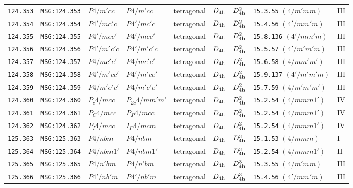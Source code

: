 \documentclass[fleqn,10pt]{jsarticle}
\begin{document}
\begin{center}
\begin{longtable}{lllllllll}
\texttt{124.353} & \texttt{MSG:124.353} & $P4/m'cc$ & $P4/m'cc$ & tetragonal & $D_{\rm 4h}$ & $D_{\rm 4h}^{2}$ & \texttt{15.3.55} $(4/m'mm)$ & III \\
\texttt{124.354} & \texttt{MSG:124.354} & $P4'/mc'c$ & $P4'/mc'c$ & tetragonal & $D_{\rm 4h}$ & $D_{\rm 4h}^{2}$ & \texttt{15.4.56} $(4'/mm'm)$ & III \\
\texttt{124.355} & \texttt{MSG:124.355} & $P4'/mcc'$ & $P4'/mcc'$ & tetragonal & $D_{\rm 4h}$ & $D_{\rm 4h}^{2}$ & \texttt{15.8.136} $(4'/mm'm)$ & III \\
\texttt{124.356} & \texttt{MSG:124.356} & $P4'/m'c'c$ & $P4'/m'c'c$ & tetragonal & $D_{\rm 4h}$ & $D_{\rm 4h}^{2}$ & \texttt{15.5.57} $(4'/m'm'm)$ & III \\
\texttt{124.357} & \texttt{MSG:124.357} & $P4/mc'c'$ & $P4/mc'c'$ & tetragonal & $D_{\rm 4h}$ & $D_{\rm 4h}^{2}$ & \texttt{15.6.58} $(4/mm'm')$ & III \\
\texttt{124.358} & \texttt{MSG:124.358} & $P4'/m'cc'$ & $P4'/m'cc'$ & tetragonal & $D_{\rm 4h}$ & $D_{\rm 4h}^{2}$ & \texttt{15.9.137} $(4'/m'm'm)$ & III \\
\texttt{124.359} & \texttt{MSG:124.359} & $P4/m'c'c'$ & $P4/m'c'c'$ & tetragonal & $D_{\rm 4h}$ & $D_{\rm 4h}^{2}$ & \texttt{15.7.59} $(4/m'm'm')$ & III \\
\texttt{124.360} & \texttt{MSG:124.360} & $P_{c}4/mcc$ & $P_{2c}4/mm'm'$ & tetragonal & $D_{\rm 4h}$ & $D_{\rm 4h}^{2}$ & \texttt{15.2.54} $(4/mmm1')$ & IV \\
\texttt{124.361} & \texttt{MSG:124.361} & $P_{C}4/mcc$ & $P_{P}4/mcc$ & tetragonal & $D_{\rm 4h}$ & $D_{\rm 4h}^{2}$ & \texttt{15.2.54} $(4/mmm1')$ & IV \\
\texttt{124.362} & \texttt{MSG:124.362} & $P_{I}4/mcc$ & $I_{P}4/mcm$ & tetragonal & $D_{\rm 4h}$ & $D_{\rm 4h}^{2}$ & \texttt{15.2.54} $(4/mmm1')$ & IV \\ \hline
\texttt{125.363} & \texttt{MSG:125.363} & $P4/nbm$ & $P4/nbm$ & tetragonal & $D_{\rm 4h}$ & $D_{\rm 4h}^{3}$ & \texttt{15.1.53} $(4/mmm)$ & I \\
\texttt{125.364} & \texttt{MSG:125.364} & $P4/nbm1'$ & $P4/nbm1'$ & tetragonal & $D_{\rm 4h}$ & $D_{\rm 4h}^{3}$ & \texttt{15.2.54} $(4/mmm1')$ & II \\
\texttt{125.365} & \texttt{MSG:125.365} & $P4/n'bm$ & $P4/n'bm$ & tetragonal & $D_{\rm 4h}$ & $D_{\rm 4h}^{3}$ & \texttt{15.3.55} $(4/m'mm)$ & III \\
\texttt{125.366} & \texttt{MSG:125.366} & $P4'/nb'm$ & $P4'/nb'm$ & tetragonal & $D_{\rm 4h}$ & $D_{\rm 4h}^{3}$ & \texttt{15.4.56} $(4'/mm'm)$ & III \\

\end{longtable}
\end{center}
\end{document}
